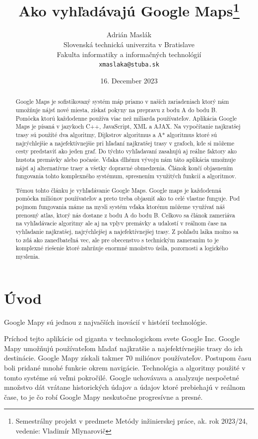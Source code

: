 \documentclass[10pt,slovak,a4paper]{article}
\title{Ako vyhľadávajú Google Maps\thanks{Semestrálny projekt v predmete Metódy inžinierskej práce, ak. rok 2023/24, vedenie: Vladimír Mlynarovič}} %
\author{Adrián Maslák\\[2pt]
	{\small Slovenská technická univerzita v Bratislave}\\
	{\small Fakulta informatiky a informačných technológií}\\
	{\small \texttt{xmaslaka@stuba.sk}}
	}
\date{\small 16. December 2023} %
\begin{document}
\maketitle

\begin{abstract}
Google Maps je sofistikovaný systém máp priamo v naších zariadeniach ktorý nám umožňuje nájsť nové miesta, získať pokyny na prepravu z bodu A do bodu B. Pomôcka ktorú každodenne používa viac než miliarda používateľov.
	Aplikácia Google Maps je písaná v jazykoch C++, JavaScript, XML a AJAX.  Na vypočítanie najkratšej trasy sú použíté dva algoritmy, Dijkstrov algoritmus a A* algoritmus ktoré sú najrýchlejšie a najefektívnejšie pri hľadaní najkratšej trasy v grafoch, kde si môžeme cesty predstaviť ako jeden graf. Do týchto vyhľadavaní zasahujú aj reálne faktory ako hustota premávky alebo počasie. Vďaka dlhému vývoju nám táto aplikácia umožnuje nájsť aj alternatívne trasy a všetky dopravné obmedzenia.
	Článok končí objasnením fungovania tohto komplexného systémum, spresnením využitých funkcií a algoritmov.

Témou tohto článku je vyhľadávanie Google Maps. Google maps je každodenná pomôcka miliónov používateľov a preto treba objasniť ako to celé vlastne funguje. Pod pojmom fungovania máme na mysli systém vďaka ktorému môžeme využívať náš prenosný atlas, ktorý nás dostane z bodu A do bodu B. Celkovo sa článok zameriáva na vyhľadávacie algoritmy ale aj na vplyv premávky a udalostí v reálnom čase na vyhľadanie najkratšej, najrýchlejšej a najefektívnejšej trasy. Z pohľadu laika možno sa to zdá ako zanedbateľná vec, ale pre obecenstvo s technickým zameraním to je komplexné riešenie ktoré zahrňuje enormné množstvo úsila, pozornosti a logického myslenia. 
\end{abstract}



\section{Úvod}
\cite{GOOGLEMAPS}
Google Mapy sú jednou z najvačších inovácií v histórií technológie. \cite{GMaps}


Príchod tejto aplikácie od giganta v technologickom svete Google Inc. Google Mapy umožňujú používateľom hľadať najkratšie a najefektívnejšie trasy do ich destinácie. Google Mapy získali takmer 70 miliónov používateľov.\cite{GmapWorks} Postupom času boli pridané mnohé funkcie okrem navigácie. Technológia a algoritmy použité v tomto systéme sú veľmi pokročilé. \cite{behindGmap}Google uchovávava a analyzuje nespočetné množstvo dát vrátane historických údajov a údajov ktoré prebiehajú v reálnom čase, to je čo robí Google Mapy neskutočne progresívne a presné.
\end{document}
